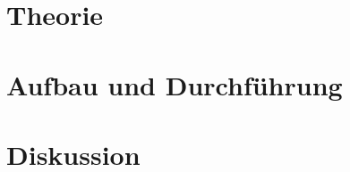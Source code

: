 \documentclass[captions=tableheading]{scrartcl}
\begin{document}
  \section{Theorie}
  \section{Aufbau und Durchführung}
  \section{Diskussion}
\end{document}
